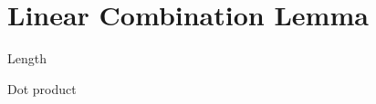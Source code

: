 \documentclass[10pt,t,serif,professionalfont]{beamer}
\begin{document}
\section{Linear Combination Lemma}
\begin{frame}{Length} 
\end{frame}




\begin{frame}{Dot product} 
\end{frame}




% 
\end{document}
